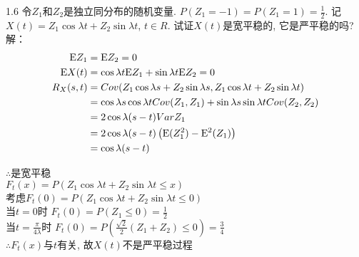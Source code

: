 1.6 令$ Z_1 $和$ Z_2 $是独立同分布的随机变量. $P(Z_1 = -1) = P(Z_1 = 1) = \frac{1}{2}$. 记$X(t) = Z_1\cos\lambda t + Z_2\sin\lambda t$, $t \in R$. 试证$X(t)$是宽平稳的, 它是严平稳的吗?\\
解：
	\[
	\begin{aligned}
	\mathrm{E} Z_1 & = \mathrm{E} Z_2 = 0\\
	\mathrm{E} X(t) & = \cos\lambda t\mathrm{E} Z_1 + \sin\lambda t\mathrm{E} Z_2 = 0\\
	R_X(s, t) & = Cov(Z_1\cos\lambda s + Z_2\sin\lambda s, Z_1\cos\lambda t + Z_2\sin\lambda t)\\
			& = \cos\lambda s \cos\lambda tCov(Z_1, Z_1) + \sin\lambda s\sin\lambda tCov(Z_2, Z_2)\\
			& = 2\cos\lambda(s-t)VarZ_1\\
			& = 2\cos\lambda(s-t)\left(\mathrm{E} (Z_1^2) - \mathrm{E} ^2(Z_1)\right)\\
			& = \cos\lambda(s-t)
	\end{aligned}
	\]
	\begin{flushleft}
	$\therefore $是宽平稳\\
	$F_t(x) = P(Z_1\cos\lambda t + Z_2\sin\lambda t \leqslant x)$\\
	考虑$F_t(0) = P(Z_1\cos\lambda t + Z_2\sin\lambda t \leqslant 0)$\\
	当$t = 0$时 $F_t(0) = P(Z_1 \leqslant 0) = \frac{1}{2}$\\
	当$t = \frac{\pi}{4\lambda}$时 $F_t(0) = P\left(\frac{\sqrt{2}}{2}(Z_1+Z_2) \leqslant 0\right) = \frac{3}{4}$\\
	$\therefore F_t(x)$与$t$有关, 故$X(t)$不是严平稳过程\\
	\end{flushleft}



